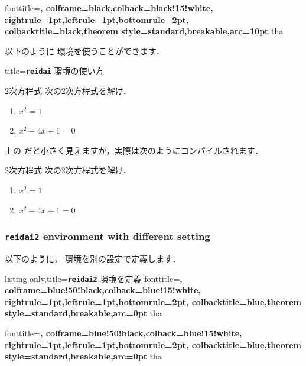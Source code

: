 \documentclass[../geometrymemo.tex]{subfiles}
\begin{document}
{fonttitle=\gtfamily\sffamily\bfseries\upshape\large,
    colframe=black,colback=black!15!white,
    rightrule=1pt,leftrule=1pt,bottomrule=2pt,
    colbacktitle=black,theorem style=standard,breakable,arc=10pt}
{tha}

以下のように  環境を使うことができます．
\begin{tcblisting}{title=\textbf{\texttt{reidai}} 環境の使い方}
    \begin{reidai}{2次方程式}{}
        次の2次方程式を解け．\vspace{-8pt}
        \begin{enumerate}[(1)\;]
            \item \(x^2=1\)
            \item \(x^2-4x+1=0\)
        \end{enumerate}
    \end{reidai}
\end{tcblisting}

上の  だと小さく見えますが，実際は次のようにコンパイルされます．
\begin{reidai}{2次方程式}{}
    次の2次方程式を解け．\vspace{-8pt}
    \begin{enumerate}[(1)\;]
        \item \(x^2=1\)
        \item \(x^2-4x+1=0\)
    \end{enumerate}
\end{reidai}

\subsubsection{\textbf{\texttt{reidai2}} environment with different setting}

以下のように， 環境を別の設定で定義します．

\begin{tcblisting}{listing only,title=\texttt{\textbf{reidai2}} 環境を定義}
    {fonttitle=\gtfamily\sffamily\bfseries\upshape\large,
        colframe=blue!50!black,colback=blue!15!white,
        rightrule=1pt,leftrule=1pt,bottomrule=2pt,
        colbacktitle=blue,theorem style=standard,breakable,arc=0pt}
    {tha}
\end{tcblisting}

{fonttitle=\gtfamily\sffamily\bfseries\upshape\large,
    colframe=blue!50!black,colback=blue!15!white,
    rightrule=1pt,leftrule=1pt,bottomrule=2pt,
    colbacktitle=blue,theorem style=standard,breakable,arc=0pt}
{tha}
\end{document}
